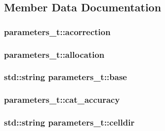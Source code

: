 \subsection{Member Data Documentation}
\hypertarget{structparameters__t_a9f6196ea8bb9f5d753b2fb2ce42f508a}{
\subsubsection[{acorrection}]{ parameters\-\_\-t\-::acorrection}}\label{structparameters__t_a9f6196ea8bb9f5d753b2fb2ce42f508a}
\hypertarget{structparameters__t_a05971cf7e11f757b0f6ab370929670dd}{
\subsubsection[{allocation}]{ parameters\-\_\-t\-::allocation}}\label{structparameters__t_a05971cf7e11f757b0f6ab370929670dd}
\hypertarget{structparameters__t_a01dba518211d012322f81de8fa11ace1}{
\subsubsection[{base}]{\setlength{\rightskip}{0pt plus 5cm}std\-::string parameters\-\_\-t\-::base}}\label{structparameters__t_a01dba518211d012322f81de8fa11ace1}
\hypertarget{structparameters__t_a3fe62df5f1220dfe84a2b6f4a2296e0c}{
\subsubsection[{cat\-\_\-accuracy}]{ parameters\-\_\-t\-::cat\-\_\-accuracy}}\label{structparameters__t_a3fe62df5f1220dfe84a2b6f4a2296e0c}
\hypertarget{structparameters__t_a385fab9a33c11108c0dd32779cf1516b}{
\subsubsection[{celldir}]{\setlength{\rightskip}{0pt plus 5cm}std\-::string parameters\-\_\-t\-::celldir}}\label{structparameters__t_a385fab9a33c11108c0dd32779cf1516b}
